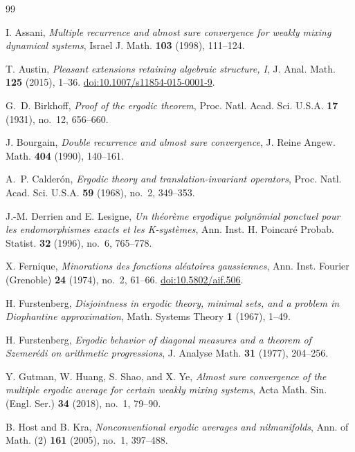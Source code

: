\begin{thebibliography}{99}
\raggedright

I. Assani,
\emph{Multiple recurrence and almost sure convergence for weakly mixing
dynamical systems},
Israel J. Math. \textbf{103} (1998), 111--124.

T. Austin,
\emph{Pleasant extensions retaining algebraic structure, I},
J. Anal. Math. \textbf{125} (2015), 1--36.
\href{https://doi.org/10.1007/s11854-015-0001-9}{doi:10.1007/s11854-015-0001-9}.

G.~D. Birkhoff,
\emph{Proof of the ergodic theorem},
Proc. Natl. Acad. Sci. U.S.A. \textbf{17} (1931), no.~12, 656--660.

J. Bourgain,
\emph{Double recurrence and almost sure convergence},
J. Reine Angew. Math. \textbf{404} (1990), 140--161.

A.~P. Calder\'on,
\emph{Ergodic theory and translation-invariant operators},
Proc. Natl. Acad. Sci. U.S.A. \textbf{59} (1968), no.~2, 349--353.

J.-M. Derrien and E. Lesigne,
\emph{Un th\'eor\`eme ergodique polyn\^omial ponctuel pour les
endomorphismes exacts et les K-syst\`emes},
Ann. Inst. H. Poincar\'e Probab. Statist. \textbf{32} (1996), no.~6,
765--778.

X. Fernique,
\emph{Minorations des fonctions al\'eatoires gaussiennes},
Ann. Inst. Fourier (Grenoble) \textbf{24} (1974), no.~2, 61--66.
\href{https://doi.org/10.5802/aif.506}{doi:10.5802/aif.506}.

H. Furstenberg,
\emph{Disjointness in ergodic theory, minimal sets, and a problem in
Diophantine approximation},
Math. Systems Theory \textbf{1} (1967), 1--49.

H. Furstenberg,
\emph{Ergodic behavior of diagonal measures and a theorem of Szemer\'edi
on arithmetic progressions},
J. Analyse Math. \textbf{31} (1977), 204--256.

Y. Gutman, W. Huang, S. Shao, and X. Ye,
\emph{Almost sure convergence of the multiple ergodic average for certain
weakly mixing systems},
Acta Math. Sin. (Engl. Ser.) \textbf{34} (2018), no.~1, 79--90.

B. Host and B. Kra,
\emph{Nonconventional ergodic averages and nilmanifolds},
Ann. of Math. (2) \textbf{161} (2005), no.~1, 397--488.


\end{thebibliography}
